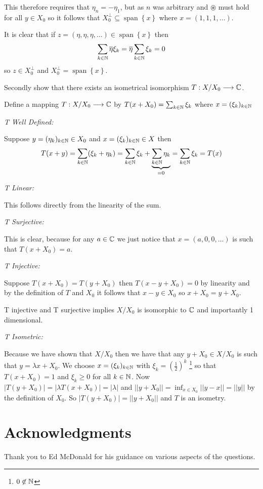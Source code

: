 \documentclass{unswmaths}
\begin{document}
This therefore requires that $ \eta_n = -\eta_1 $, but as $ n $ was arbitrary and $\circledast $ must hold for all $ y \in X_0 $ so it follows that $ X_0^\perp \subseteq \operatorname{span}\left\{ x\right\}$ where $ x = (1,1,1,\ldots) $.

It is clear that if $ z = (\eta, \eta, \eta, \ldots) \in \operatorname{span}\left\{ x \right\} $ then 
$$
	\sum_{k \in \mathbb{N}} \overline{\eta} \xi_k = \overline{\eta} \sum_{k \in \mathbb{N}} \xi_k = 0
$$
so $ z \in X_0^\perp $ and $ X_0^\perp = \operatorname{span}\left\{ x \right\} $.

Secondly show that there exists an isometrical isomorphism $ T : X/X_0 \longrightarrow \mathbb{C} $.

Define a mapping $ T : X/X_0 \longrightarrow \mathbb{C} $ by $ T(x + X_0) = \sum_{k \in \mathbb{N}}\xi_k $ where $ x = (\xi_k)_{k \in \mathbb{N}} $

\emph{T Well Defined: }

Suppose $ y = (\eta_k)_{k \in \mathbb{N}} \in X_0 $ and $ x = (\xi_k)_{k \in \mathbb{N}} \in X $ then 
$$ T(x +y) =  \sum_{k \in \mathbb{N}} (\xi_k + \eta_k) = \sum_{k \in \mathbb{N}} \xi_k + \underbrace{\sum_{k \in \mathbb{N}} \eta_k}_{=0} = \sum_{k \in \mathbb{N}} \xi_k = T(x) $$

\emph{T Linear: }

This follows directly from the linearity of the sum.

\emph{T Surjective: }

This is clear, because for any $ a \in \mathbb{C} $ we just notice that $ x = (a, 0, 0, \ldots ) $ is such that $ T(x + X_0) = a $.

\emph{T Injective: }

Suppose $ T(x + X_0) = T(y + X_0) $ then $ T(x -y  + X_0) = 0 $ by linearity and by the definition of $ T $ and $ X_0 $ it follows that $ x - y \in X_0 $ so $ x + X_0 = y + X_0 $.


T injective and T surjective implies $ X/X_0 $ is isomorphic to $ \mathbb{C} $ and importantly 1 dimensional.

\emph{T Isometric: }

Because we have shown that $ X/X_0 $ then we have that any $ y + X_0 \in X / X_0 $ is such that $ y = \lambda x + X_0 $. 
We choose $ x= (\xi_k )_{k \in \mathbb{N}} $ with $ \xi_k = \left(\frac{1}{2} \right)^k $ \footnote{ $ 0 \not\in \mathbb{N} $ } so that $ T(x + X_0) = 1 $ and $ \xi_k \geq 0 $ for all $ k \in \mathbb{N} $.
Now $ |T(y + X_0)| = |\lambda T(x+X_0)| = |\lambda| $ and $ ||y + X_0|| = \inf_{x \in X_0} ||y - x|| = ||y|| $ by the definition of $ X_0 $.
So $ |T(y + X_0)| = ||y + X_0 || $ and $ T $ is an isometry.

\section*{Acknowledgments}
Thank you to Ed McDonald for his guidance on various aspects of the questions.
\end{document}
